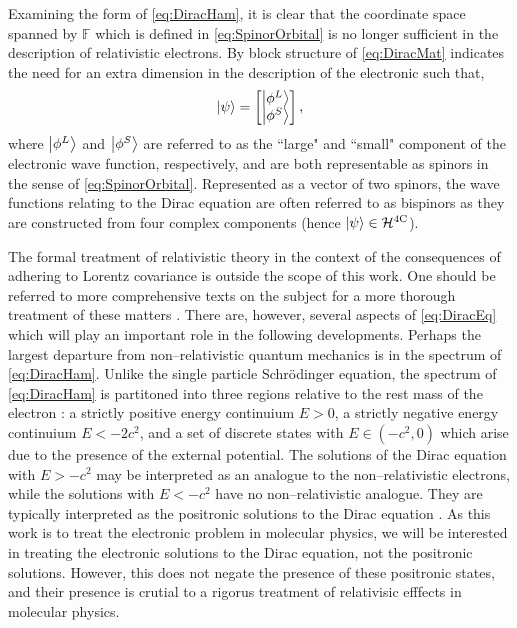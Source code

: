 Examining the form of \cref{eq:DiracHam}, it is clear that the coordinate space spanned by $\mathbb F$
which is defined in \cref{eq:SpinorOrbital} is no longer sufficient in the description of relativistic 
electrons. By block structure of \cref{eq:DiracMat} indicates the need for an extra dimension in the 
description of the electronic such that,
\begin{equation}
\label{eq:Bispinor}
\left\vert \psi \right\rangle = \begin{bmatrix} \left\vert \phi^L \right\rangle \\ \left\vert \phi^S \right\rangle \end{bmatrix},
\end{equation}
where $\left\vert \phi^L \right\rangle$ and $\left\vert \phi^S \right\rangle$ are referred to as the ``large" and ``small" component of the 
electronic wave function, respectively, and are both representable as spinors in the sense of
\cref{eq:SpinorOrbital}. Represented as a vector of two spinors, the wave functions relating to the Dirac equation
are often referred to as bispinors  as they are constructed from four complex components (hence 
$\left\vert \psi \right\rangle \in \mathcal{H}^{\mathrm{4C}}$). 

The formal treatment of relativistic theory in the context of the consequences of adhering to Lorentz 
covariance is outside the scope of this work. One should be referred to more comprehensive texts on
the subject for a more thorough treatment of these matters . There are, however, several
aspects of \cref{eq:DiracEq} which will play an important role in the following developments. Perhaps
the largest departure from non--relativistic quantum mechanics is in the spectrum of \cref{eq:DiracHam}.
Unlike the single particle Schr\"{o}dinger equation, the spectrum of \cref{eq:DiracHam} is partitoned
into three regions relative to the rest mass of the electron : a strictly positive energy continuium 
$E > 0$, a strictly negative energy continuium $E < -2c^2$, and a set of discrete states with $E \in (-c^2,0)$ which
arise due to the presence of the external potential. The solutions of the Dirac equation with $E > -c^2$
may be interpreted as an analogue to the non--relativistic electrons, while the solutions with $E < -c^2$
have no non--relativistic analogue. They are typically interpreted as the positronic solutions to the Dirac
equation . As this work is to treat the electronic problem in molecular physics, we will
be interested in treating the electronic solutions to the Dirac equation, not the positronic solutions.
However, this does not negate the presence of these positronic states, and their presence is
crutial to a rigorus treatment of relativisic efffects in molecular physics.

